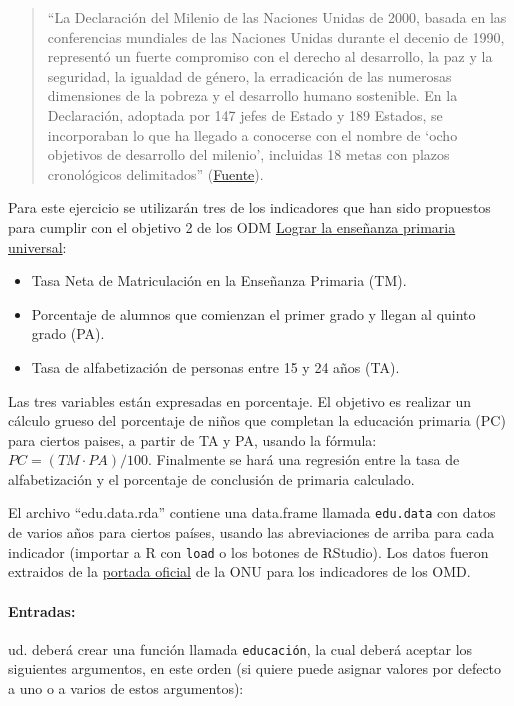 \documentclass{article}
\begin{document}
\begin{quote}
``La Declaración del Milenio de las Naciones Unidas de 2000, basada en
las conferencias mundiales de las Naciones Unidas durante el decenio de
1990, representó un fuerte compromiso con el derecho al desarrollo, la
paz y la seguridad, la igualdad de género, la erradicación de las
numerosas dimensiones de la pobreza y el desarrollo humano sostenible.
En la Declaración, adoptada por 147 jefes de Estado y 189 Estados, se
incorporaban lo que ha llegado a conocerse con el nombre de `ocho
objetivos de desarrollo del milenio', incluidas 18 metas con plazos
cronológicos delimitados''
(\href{http://unstats.un.org/unsd/publication/seriesf/Seriesf\_95s.pdf}{Fuente}).

\end{quote}
Para este ejercicio se utilizarán tres de los indicadores que han sido
propuestos para cumplir con el objetivo 2 de los ODM
\href{http://www.undp.org/content/undp/es/home/mdgoverview/mdg\_goals/mdg2/}{Lograr
la enseñanza primaria universal}:

\begin{itemize}
\item
  Tasa Neta de Matriculación en la Enseñanza Primaria (TM).
\item
  Porcentaje de alumnos que comienzan el primer grado y llegan al quinto
  grado (PA).
\item
  Tasa de alfabetización de personas entre 15 y 24 años (TA).
\end{itemize}
Las tres variables están expresadas en porcentaje. El objetivo es
realizar un cálculo grueso del porcentaje de niños que completan la
educación primaria (PC) para ciertos paises, a partir de TA y PA, usando
la fórmula: $PC = (TM \cdot PA) / 100$. Finalmente se hará una regresión
entre la tasa de alfabetización y el porcentaje de conclusión de
primaria calculado.

El archivo ``edu.data.rda'' contiene una data.frame llamada
\verb!edu.data! con datos de varios años para ciertos países, usando las
abreviaciones de arriba para cada indicador (importar a R con
\verb!load! o los botones de RStudio). Los datos fueron extraidos de la
\href{http://mdgs.un.org/unsd/mdg/Data.aspx}{portada oficial} de la ONU
para los indicadores de los OMD.

\paragraph{Entradas:}

ud. deberá crear una función llamada \verb!educación!, la cual deberá
aceptar los siguientes argumentos, en este orden (si quiere puede
asignar valores por defecto a uno o a varios de estos argumentos):
\end{document}
